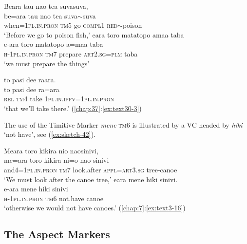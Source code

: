 \documentclass[output=paper]{langscibook}
\begin{document}
\ea\label{ex:sketch-41}
    \ea\label{ex:sketch-41a}
        Beara tau nao tea suvasuva,\\
        \gll be=ara tau nao tea suva{$\sim$}suva\\
        when=1\textsc{pl}.\textsc{in}.\textsc{pron} \textsc{tm}5 go \textsc{compl}1 \textsc{red}{$\sim$}poison\\
        \glt `Before we go to poison fish,'
    \ex\label{ex:sketch-41b}
        eara toro matatopo amaa taba\\
        \gll e-ara toro matatopo a=maa taba\\
        \textsc{h}-1\textsc{pl}.\textsc{in}.\textsc{pron} \textsc{tm}7 prepare \textsc{art}2.\textsc{sg}=\textsc{plm}	taba\\
        \glt `we must prepare the things'

\newpage
    \ex\label{ex:sketch-41c}
        to pasi dee raara.\\
        \gll to pasi dee ra=ara\\
        \textsc{rel} \textsc{tm}4 take 1\textsc{pl}.\textsc{in}.\textsc{ipfv}=1\textsc{pl}.\textsc{in}.\textsc{pron}\\
        \glt `that we'll take there.' (\ref{chap:37}:\ref{ex:text30-3})   
    \z
\z

The use of the Timitive Marker \textit{mene} \textsc{tm}6 is illustrated by a VC headed by \textit{hiki} `not have', see (\ref{ex:sketch-42}).

\ea\label{ex:sketch-42}
    \ea\label{ex:sketch-42a}
        Meara toro kikira nio naosinivi,\\
        \gll me=ara toro kikira ni=o nao-sinivi\\
        and4=1\textsc{pl}.\textsc{in}.\textsc{pron} \textsc{tm}7 look.after \textsc{appl}=\textsc{art}3.\textsc{sg} tree-canoe\\
        \glt `We must look after the canoe tree,'
    \ex\label{ex:sketch-42b}
        eara mene hiki sinivi.\\
        \gll e-ara mene hiki sinivi\\
        \textsc{h}-1\textsc{pl}.\textsc{in}.\textsc{pron} \textsc{tm}6 not.have canoe\\
        \glt `otherwise we would not have canoes.' (\ref{chap:7}:\ref{ex:text3-16})
    \z
\z

\subsection{The Aspect Markers}\label{sec:aspekt}
\end{document}
